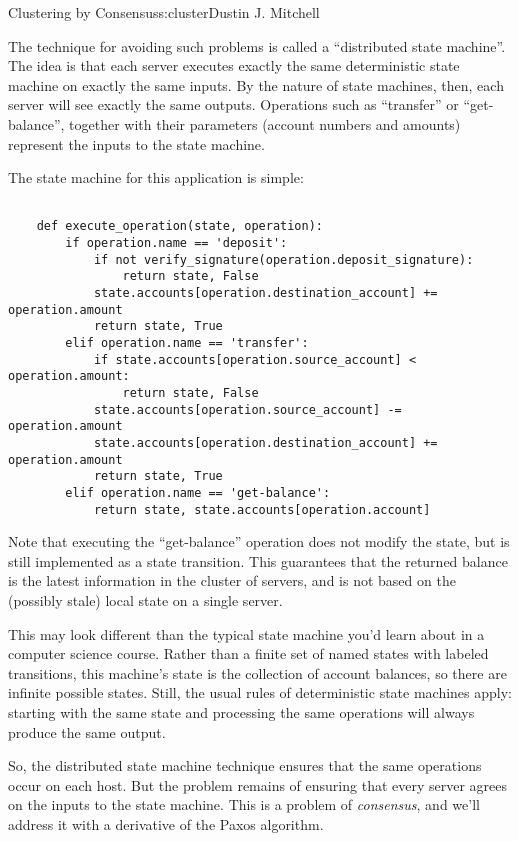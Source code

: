 \begin{aosachapter}{Clustering by Consensus}{s:cluster}{Dustin J. Mitchell}
\label{distributed-state-machines}

The technique for avoiding such problems is called a ``distributed state
machine''. The idea is that each server executes exactly the same
deterministic state machine on exactly the same inputs. By the nature of
state machines, then, each server will see exactly the same outputs.
Operations such as ``transfer'' or ``get-balance'', together with their
parameters (account numbers and amounts) represent the inputs to the
state machine.

The state machine for this application is simple:

\begin{verbatim}

    def execute_operation(state, operation):
        if operation.name == 'deposit':
            if not verify_signature(operation.deposit_signature):
                return state, False
            state.accounts[operation.destination_account] += operation.amount
            return state, True
        elif operation.name == 'transfer':
            if state.accounts[operation.source_account] < operation.amount:
                return state, False
            state.accounts[operation.source_account] -= operation.amount
            state.accounts[operation.destination_account] += operation.amount
            return state, True
        elif operation.name == 'get-balance':
            return state, state.accounts[operation.account]
\end{verbatim}

Note that executing the ``get-balance'' operation does not modify the
state, but is still implemented as a state transition. This guarantees
that the returned balance is the latest information in the cluster of
servers, and is not based on the (possibly stale) local state on a
single server.

This may look different than the typical state machine you'd learn about
in a computer science course. Rather than a finite set of named states
with labeled transitions, this machine's state is the collection of
account balances, so there are infinite possible states. Still, the
usual rules of deterministic state machines apply: starting with the
same state and processing the same operations will always produce the
same output.

So, the distributed state machine technique ensures that the same
operations occur on each host. But the problem remains of ensuring that
every server agrees on the inputs to the state machine. This is a
problem of \emph{consensus}, and we'll address it with a derivative of
the Paxos algorithm.


\end{aosachapter}
